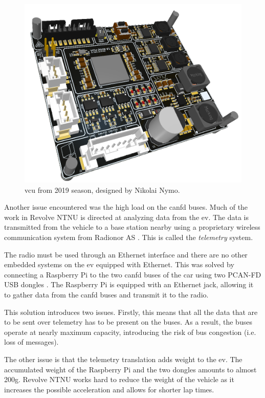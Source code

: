 \begin{figure}[H]
    \centering
    \includegraphics[width=.95\textwidth]{media/vcu19.png}
    \caption{\acrshort{vcu} from 2019 season, designed by Nikolai Nymo.}
    \label{fig:vcu19}
\end{figure}

Another issue encountered was the high load on the \acrfull{canfd} buses. Much of the work in Revolve NTNU is directed at analyzing data from the \acrshort{ev}. The data is transmitted from the vehicle to a base station nearby using a proprietary wireless communication system from Radionor AS \cite{radionor}. This is called the \emph{telemetry} system.

The radio must be used through an Ethernet interface and there are no other embedded systems on the \acrshort{ev} equipped with Ethernet. This was solved by connecting a Raspberry Pi \cite{rpi} to the two \acrshort{canfd} buses of the car using two PCAN-FD USB dongles \cite{pcan}. The Raspberry Pi is equipped with an Ethernet jack, allowing it to gather data from the \acrshort{canfd} buses and transmit it to the radio.

This solution introduces two issues. Firstly, this means that all the data that are to be sent over telemetry has to be present on the buses. As a result, the buses operate at nearly maximum capacity, introducing the risk of bus congestion (i.e. loss of messages).

The other issue is that the telemetry translation adds weight to the \acrshort{ev}. The accumulated weight of the Raspberry Pi and the two dongles amounts to almost 200\si{\gram}. Revolve NTNU works hard to reduce the weight of the vehicle as it increases the possible acceleration and allows for shorter lap times.


